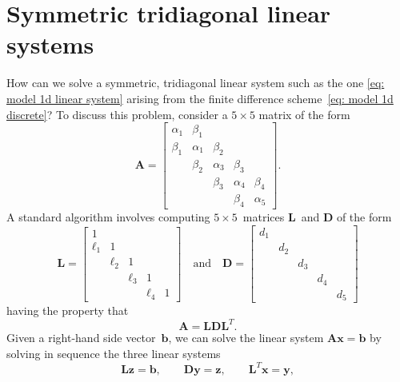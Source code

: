 \section{Symmetric tridiagonal linear systems}
\label{sec: sym tridiagonal}
How can we solve a symmetric, tridiagonal linear system such as the one
\eqref{eq: model 1d linear system} arising from the finite difference 
scheme~\eqref{eq: model 1d discrete}?  To discuss this problem, consider a 
$5\times5$ matrix of the form
\begin{equation}\label{eq: A symm tridiagonal}
\boldsymbol{A}=\begin{bmatrix}
\alpha_1& \beta_1&        &        &\\
 \beta_1&\alpha_1& \beta_2&        &\\
        & \beta_2&\alpha_3&\beta_3 &\\
        &        & \beta_3&\alpha_4&\beta_4\\
        &        &        & \beta_4&\alpha_5
\end{bmatrix}.
\end{equation}
A standard algorithm involves computing $5\times5$~matrices 
$\boldsymbol{L}$~and $\boldsymbol{D}$ of the form
\[
\boldsymbol{L}=\begin{bmatrix}
     1&      &      &      &\\
\ell_1&     1&      &      &\\
      &\ell_2&     1&      &\\
      &      &\ell_3&     1&\\
      &      &      &\ell_4&1
  \end{bmatrix}
\quad\text{and}\quad
\boldsymbol{D}=\begin{bmatrix}
d_1&   &   &   &\\
   &d_2&   &   &\\
   &   &d_3&   &\\
   &   &   &d_4&\\
   &   &   &   &d_5
  \end{bmatrix}
\]
having the property that
\begin{equation}\label{eq: L D LT}
\boldsymbol{A}=\boldsymbol{L}\boldsymbol{D}\boldsymbol{L}^T.
\end{equation}
Given a right-hand side vector~$\boldsymbol{b}$, we can solve the linear system
$\boldsymbol{A}\boldsymbol{x}=\boldsymbol{b}$ by solving in sequence the three
linear systems
\begin{equation}\label{eq: LDLT systems}
\boldsymbol{L}\boldsymbol{z}=\boldsymbol{b},\qquad
\boldsymbol{D}\boldsymbol{y}=\boldsymbol{z},\qquad
\boldsymbol{L}^T\boldsymbol{x}=\boldsymbol{y},
\end{equation}
